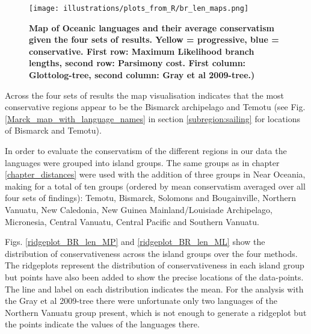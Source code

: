 \documentclass[draft,10pt]{article} %
\begin{document}


\newpage
\begin{figure}
\centering
\texttt{[image: illustrations/plots\_from\_R/br\_len\_maps.png]}
\caption[Map of Oceanic languages and their average conservatism given the four sets of results.]{\textbf{Map of Oceanic languages and their average conservatism given the four sets of results. Yellow = progressive, blue = conservative. First row: Maximum Likelihood branch lengths, second row: Parsimony cost. First column: Glottolog-tree, second column: Gray et al 2009-tree.)}}
\label{map_br_lens}
\end{figure}

Across the four sets of results the map visualisation indicates that the most conservative regions appear to be the Bismarck archipelago and Temotu (see Fig. \ref{Marck_map_with_language_names} in section \ref{subregion:sailing} for locations of Bismarck and Temotu).

In order to evaluate the conservatism of the different regions in our data the languages were grouped into island groups. The same groups as in chapter \ref{chapter_distances} were used with the addition of three groups in Near Oceania, making for a total of ten groups (ordered by mean conservatism averaged over all four sets of findings): Temotu, Bismarck, Solomons and Bougainville, Northern Vanuatu, New Caledonia, New Guinea Mainland/Louisiade Archipelago, Micronesia, Central Vanuatu, Central Pacific and Southern Vanuatu. 

Figs. \ref{ridgeplot_BR_len_MP} and \ref{ridgeplot_BR_len_ML} show the distribution of conservativeness across the island groups over the four methods. The ridgeplots represent the distribution of conservativeness in each island group but points have also been added to show the precise locations of the data-points. The line and label on each distribution indicates the mean. For the analysis with the Gray et al 2009-tree there were unfortunate only two languages of the Northern Vanuatu group present, which is not enough to generate a ridgeplot but the points indicate the values of the languages there.
 
\end{document}
